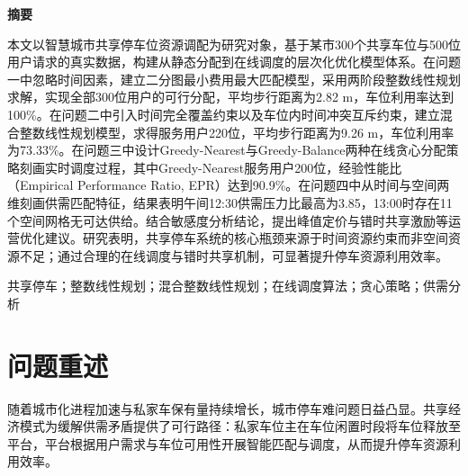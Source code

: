 \documentclass[12pt,a4paper]{ctexart}
\begin{document}
\begin{center}
  {\heiti\textbf{摘\quad 要}}
\end{center}

\vspace{10pt}

本文以智慧城市共享停车位资源调配为研究对象，基于某市300个共享车位与500位用户请求的真实数据，构建从静态分配到在线调度的层次化优化模型体系。在问题一中忽略时间因素，建立二分图最小费用最大匹配模型，采用两阶段整数线性规划求解，实现全部300位用户的可行分配，平均步行距离为2.82 m，车位利用率达到100\%。在问题二中引入时间完全覆盖约束以及车位内时间冲突互斥约束，建立混合整数线性规划模型，求得服务用户220位，平均步行距离为9.26 m，车位利用率为73.33\%。在问题三中设计Greedy-Nearest与Greedy-Balance两种在线贪心分配策略刻画实时调度过程，其中Greedy-Nearest服务用户200位，经验性能比（Empirical Performance Ratio, EPR）达到90.9\%。在问题四中从时间与空间两维刻画供需匹配特征，结果表明午间12:30供需压力比最高为3.85，13:00时存在11个空间网格无可达供给。结合敏感度分析结论，提出峰值定价与错时共享激励等运营优化建议。研究表明，共享停车系统的核心瓶颈来源于时间资源约束而非空间资源不足；通过合理的在线调度与错时共享机制，可显著提升停车资源利用效率。

\vspace{15pt}

共享停车；整数线性规划；混合整数线性规划；在线调度算法；贪心策略；供需分析


\newpage

\setcounter{page}{1}

\pagestyle{fancy}

\setlength{\baselineskip}{20pt}


\section{问题重述}

随着城市化进程加速与私家车保有量持续增长，城市停车难问题日益凸显。共享经济模式为缓解供需矛盾提供了可行路径：私家车位主在车位闲置时段将车位释放至平台，平台根据用户需求与车位可用性开展智能匹配与调度，从而提升停车资源利用效率。
\end{document}
